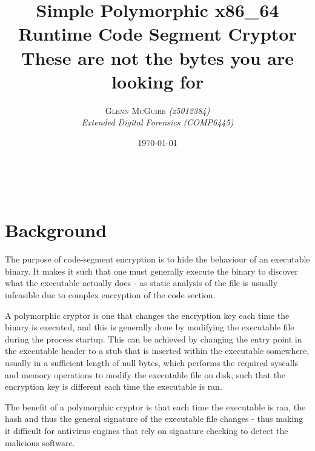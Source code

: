 \documentclass[a4paper, 11pt]{article} %
\title{\textbf{Simple Polymorphic x86\_64 Runtime Code Segment Cryptor}\\ %
These are not the bytes you are looking for} %
\author{\textsc{Glenn McGuire \textit{(z5012384)}} %
\\{\textit{Extended Digital Forensics (COMP6445)}}} %
\date{\today} %
\makeatletter
\renewcommand{\maketitle}{ %
\begin{flushright} %
{\LARGE\@title} %

\vspace{50pt} %

{\large\@author} %
\\\@date %

\vspace{40pt} %
\end{flushright}
}
\makeatother
\begin{document}
\maketitle %



%

\vspace{-40pt} %


\section*{Background}

The purpose of code-segment encryption is to hide the behaviour of an executable binary. It makes it such that one must generally execute the binary to discover what the executable actually does - as static analysis of the file is usually infeasible due to complex encryption of the code section.

A polymorphic cryptor is one that changes the encryption key each time the binary is executed, and this is generally done by modifying the executable file during the process startup. This can be achieved by changing the entry point in the executable header to a stub that is inserted within the executable somewhere, usually in a sufficient length of null bytes, which performs the required syscalls and memory operations to modify the executable file on disk, such that the encryption key is different each time the executable is ran.

The benefit of a polymorphic cryptor is that each time the executable is ran, the hash and thus the general signature of the executable file changes - thus making it difficult for antivirus engines that rely on signature checking to detect the malicious software.
\end{document}
